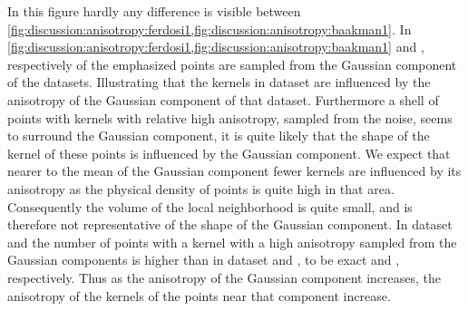 				In this figure hardly any difference is visible between \cref{fig:discussion:anisotropy:ferdosi1,fig:discussion:anisotropy:baakman1}. 
					In \cref{fig:discussion:anisotropy:ferdosi1,fig:discussion:anisotropy:baakman1}  and , respectively of the emphasized points are sampled from the Gaussian component of the datasets. Illustrating that the kernels in dataset \baakmanOne are influenced by the anisotropy of the Gaussian component of that dataset.
					Furthermore a shell of points with kernels with relative high anisotropy, sampled from the noise, seems to surround the Gaussian component, it is quite likely that the shape of the kernel of these points is influenced by the Gaussian component. 
					We expect that nearer to the mean of the Gaussian component fewer kernels are influenced by its anisotropy as the physical density of points is quite high in that area. Consequently the volume of the local neighborhood is quite small, and is therefore not representative of the shape of the Gaussian component. 
				In dataset \baakmanFour and \baakmanFive the number of points with a kernel with a high anisotropy sampled from the Gaussian components is higher than in dataset \ferdosiOne and \baakmanOne, to be exact  and , respectively. 
				Thus as the anisotropy of the Gaussian component increases, the anisotropy of the kernels of the points near that component increase.
		
